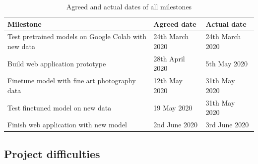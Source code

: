 \begin{table}[H]
\begin{tabular}{@{}lll@{}}
\toprule
Milestone & Agreed date & Actual date \\ \midrule
Test pretrained models on Google Colab with new data & 24th March 2020 & 24th March 2020 \\
Build web application prototype & 28th April 2020 & 5th May 2020 \\
Finetune model with fine art photography data & 12th May 2020 & 31th May 2020 \\
Test finetuned model on new data & 19 May 2020 & 31th May 2020 \\
Finish web application with new model & 2nd June 2020 & 3rd June 2020
\end{tabular}
\caption{Agreed and actual dates of all milestones}
\label{tab:milestones}
\end{table}
	
\subsection{Project difficulties}

